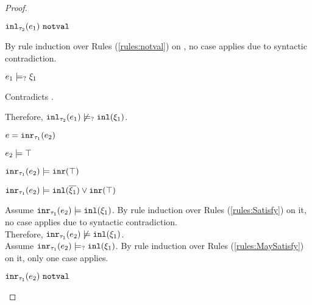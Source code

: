 \begin{proof}
\begin{byCases}
\begin{byCases}
\begin{byCases}
\begin{byCases}
\begin{pfsteps*}
                \item $\mathtt{inl}_{\tau_2}({e_1}) ~\mathtt{notval}$  
                \end{pfsteps*}
                By rule induction over Rules (\ref{rules:notval}) on , no case applies due to syntactic contradiction.
            \item[\text{(\ref{rule:CMSInl})}]
                \begin{pfsteps*}
                \item $e_1 \models_{?} \xi_1$
                \end{pfsteps*}
                Contradicts .
            \end{byCases}
            Therefore, $\mathtt{inl}_{\tau_2}({e_1}) \not\models_{?} \mathtt{inl}(\xi_1)$.
        \end{byCases}
    \item[\text{(\ref{rule:TInr})}]
        \begin{pfsteps*}
        \item $e=\mathtt{inr}_{\tau_1}({e_2})$ 
        \item $e_2 \models \top$  
        \item $\mathtt{inr}_{\tau_1}({e_2}) \models \mathtt{inr}(\top)$  
        \item $\mathtt{inr}_{\tau_1}({e_2}) \models \mathtt{inl}(\overline{\xi_1}) \vee \mathtt{inr}(\top)$ 
        \end{pfsteps*}
        Assume $\mathtt{inr}_{\tau_1}({e_2}) \models \mathtt{inl}(\xi_1)$. By rule induction over Rules (\ref{rules:Satisfy}) on it, no case applies due to syntactic contradiction.\\ Therefore, $\mathtt{inr}_{\tau_1}({e_2}) \not\models \mathtt{inl}(\xi_1)$.\\
        Assume $\mathtt{inr}_{\tau_1}({e_2}) \models_{?} \mathtt{inl}(\xi_1)$. By rule induction over Rules (\ref{rules:MaySatisfy}) on it, only one case applies.
        \begin{byCases}
        \item[\text{(\ref{rule:CMSNotVal})}]
            \begin{pfsteps*}
            \item $\mathtt{inr}_{\tau_1}({e_2}) ~\mathtt{notval}$  

\end{pfsteps*}
\end{byCases}
\end{byCases}
\end{byCases}
\end{proof}
